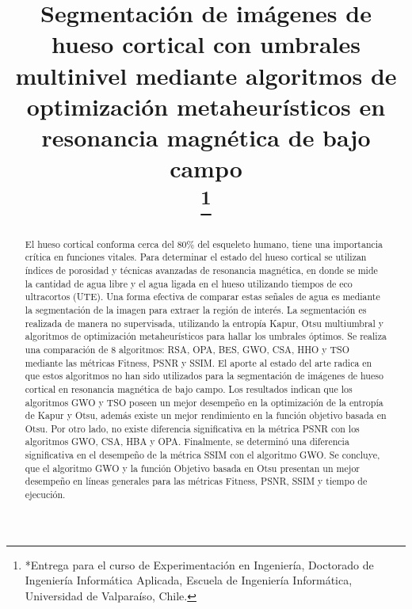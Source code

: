 \documentclass[conference]{IEEEtran}
\begin{document}
\title{Segmentación de imágenes de hueso cortical con umbrales multinivel mediante algoritmos de optimización metaheurísticos en resonancia magnética de bajo campo\\
\thanks{*Entrega para el curso de Experimentación en Ingeniería, Doctorado de Ingeniería Informática Aplicada, Escuela de Ingeniería Informática, Universidad de Valparaíso, Chile.}
}

\author{
\and
{}
}

\maketitle

\begin{abstract}
\noindent El hueso cortical conforma cerca del 80\% del esqueleto humano, tiene una importancia crítica en funciones vitales. Para determinar el estado del hueso cortical se utilizan índices de porosidad y técnicas avanzadas de resonancia magnética, en donde se mide la cantidad de agua libre y el agua ligada en el hueso utilizando tiempos de eco ultracortos (UTE). Una forma efectiva de comparar estas señales de agua es mediante la segmentación de la imagen para extraer la región de interés. La segmentación es realizada de manera no supervisada, utilizando la entropía Kapur, Otsu multiumbral y algoritmos de optimización metaheurísticos para hallar los umbrales óptimos. Se realiza una comparación de 8 algoritmos: RSA, OPA, BES, GWO, CSA, HHO y TSO mediante las métricas Fitness, PSNR y SSIM. El aporte al estado del arte radica en que estos algoritmos no han sido utilizados para la segmentación de imágenes de hueso cortical en resonancia magnética de bajo campo. Los resultados indican que los algoritmos GWO y TSO poseen un mejor desempeño en la optimización de la entropía de Kapur y Otsu, además existe un mejor rendimiento en la función objetivo basada en Otsu. Por otro lado, no existe diferencia significativa en la métrica PSNR con los algoritmos GWO, CSA, HBA y OPA. Finalmente, se determinó una diferencia significativa en el desempeño de la métrica SSIM con el algoritmo GWO. Se concluye, que el algoritmo GWO y la función Objetivo basada en Otsu presentan un mejor desempeño en líneas generales para las métricas Fitness, PSNR, SSIM y tiempo de ejecución.

\end{abstract}
\end{document}
